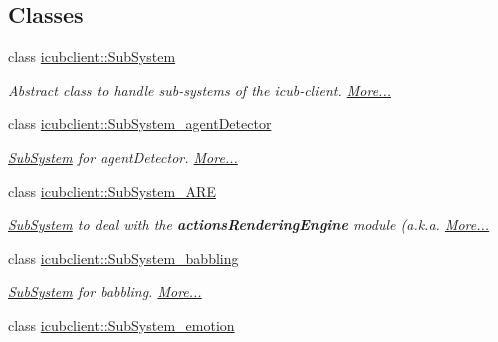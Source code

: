\subsection*{Classes}
\begin{DoxyCompactItemize}
\item 
class \hyperlink{group__icubclient__subsystems_classicubclient_1_1SubSystem}{icubclient\+::\+Sub\+System}
\begin{DoxyCompactList}\small\item\em Abstract class to handle sub-\/systems of the icub-\/client.  \hyperlink{group__icubclient__subsystems_classicubclient_1_1SubSystem}{More...}\end{DoxyCompactList}\item 
class \hyperlink{group__icubclient__subsystems_classicubclient_1_1SubSystem__agentDetector}{icubclient\+::\+Sub\+System\+\_\+agent\+Detector}
\begin{DoxyCompactList}\small\item\em \hyperlink{group__icubclient__subsystems_classicubclient_1_1SubSystem}{Sub\+System} for agent\+Detector.  \hyperlink{group__icubclient__subsystems_classicubclient_1_1SubSystem__agentDetector}{More...}\end{DoxyCompactList}\item 
class \hyperlink{group__icubclient__subsystems_classicubclient_1_1SubSystem__ARE}{icubclient\+::\+Sub\+System\+\_\+\+A\+RE}
\begin{DoxyCompactList}\small\item\em \hyperlink{group__icubclient__subsystems_classicubclient_1_1SubSystem}{Sub\+System} to deal with the {\bfseries actions\+Rendering\+Engine} module (a.\+k.\+a.  \hyperlink{group__icubclient__subsystems_classicubclient_1_1SubSystem__ARE}{More...}\end{DoxyCompactList}\item 
class \hyperlink{group__icubclient__subsystems_classicubclient_1_1SubSystem__babbling}{icubclient\+::\+Sub\+System\+\_\+babbling}
\begin{DoxyCompactList}\small\item\em \hyperlink{group__icubclient__subsystems_classicubclient_1_1SubSystem}{Sub\+System} for babbling.  \hyperlink{group__icubclient__subsystems_classicubclient_1_1SubSystem__babbling}{More...}\end{DoxyCompactList}\item 
class \hyperlink{group__icubclient__subsystems_classicubclient_1_1SubSystem__emotion}{icubclient\+::\+Sub\+System\+\_\+emotion}

\end{DoxyCompactItemize}
